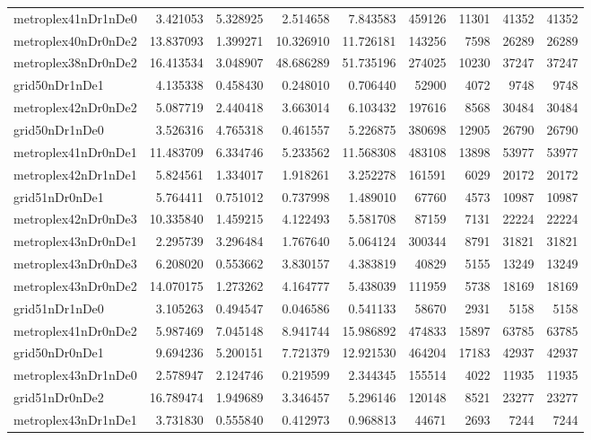 \begin{longtable}{|l|r|r|r|r|r|r|r|r|}
metroplex41nDr1nDe0 & 3.421053 & 5.328925 & 2.514658 & 7.843583 & 459126 & 11301 & 41352 & 41352 \\
metroplex40nDr0nDe2 & 13.837093 & 1.399271 & 10.326910 & 11.726181 & 143256 & 7598 & 26289 & 26289 \\
metroplex38nDr0nDe2 & 16.413534 & 3.048907 & 48.686289 & 51.735196 & 274025 & 10230 & 37247 & 37247 \\
grid50nDr1nDe1 & 4.135338 & 0.458430 & 0.248010 & 0.706440 & 52900 & 4072 & 9748 & 9748 \\
metroplex42nDr0nDe2 & 5.087719 & 2.440418 & 3.663014 & 6.103432 & 197616 & 8568 & 30484 & 30484 \\
grid50nDr1nDe0 & 3.526316 & 4.765318 & 0.461557 & 5.226875 & 380698 & 12905 & 26790 & 26790 \\
metroplex41nDr0nDe1 & 11.483709 & 6.334746 & 5.233562 & 11.568308 & 483108 & 13898 & 53977 & 53977 \\
metroplex42nDr1nDe1 & 5.824561 & 1.334017 & 1.918261 & 3.252278 & 161591 & 6029 & 20172 & 20172 \\
grid51nDr0nDe1 & 5.764411 & 0.751012 & 0.737998 & 1.489010 & 67760 & 4573 & 10987 & 10987 \\
metroplex42nDr0nDe3 & 10.335840 & 1.459215 & 4.122493 & 5.581708 & 87159 & 7131 & 22224 & 22224 \\
metroplex43nDr0nDe1 & 2.295739 & 3.296484 & 1.767640 & 5.064124 & 300344 & 8791 & 31821 & 31821 \\
metroplex43nDr0nDe3 & 6.208020 & 0.553662 & 3.830157 & 4.383819 & 40829 & 5155 & 13249 & 13249 \\
metroplex43nDr0nDe2 & 14.070175 & 1.273262 & 4.164777 & 5.438039 & 111959 & 5738 & 18169 & 18169 \\
grid51nDr1nDe0 & 3.105263 & 0.494547 & 0.046586 & 0.541133 & 58670 & 2931 & 5158 & 5158 \\
metroplex41nDr0nDe2 & 5.987469 & 7.045148 & 8.941744 & 15.986892 & 474833 & 15897 & 63785 & 63785 \\
grid50nDr0nDe1 & 9.694236 & 5.200151 & 7.721379 & 12.921530 & 464204 & 17183 & 42937 & 42937 \\
metroplex43nDr1nDe0 & 2.578947 & 2.124746 & 0.219599 & 2.344345 & 155514 & 4022 & 11935 & 11935 \\
grid51nDr0nDe2 & 16.789474 & 1.949689 & 3.346457 & 5.296146 & 120148 & 8521 & 23277 & 23277 \\
metroplex43nDr1nDe1 & 3.731830 & 0.555840 & 0.412973 & 0.968813 & 44671 & 2693 & 7244 & 7244 \\

\end{longtable}
